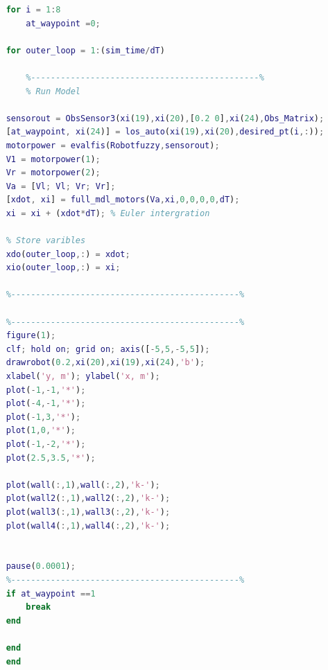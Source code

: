 \documentclass{l4proj}
\begin{document}
\begin{lstlisting}[language=Matlab, float, caption={Task 2 ,With additional waypoints (Test 2)}, label=lst:callahan]
%----------------------------------------------%
    for i = 1:8 
        at_waypoint =0;
    
    for outer_loop = 1:(sim_time/dT)
    
        %----------------------------------------------%
        % Run Model
   
    sensorout = ObsSensor3(xi(19),xi(20),[0.2 0],xi(24),Obs_Matrix);
    [at_waypoint, xi(24)] = los_auto(xi(19),xi(20),desired_pt(i,:));
    motorpower = evalfis(Robotfuzzy,sensorout);
    V1 = motorpower(1);
    Vr = motorpower(2);
    Va = [Vl; Vl; Vr; Vr];
    [xdot, xi] = full_mdl_motors(Va,xi,0,0,0,0,dT);   
    xi = xi + (xdot*dT); % Euler intergration
    
    % Store varibles
    xdo(outer_loop,:) = xdot;
    xio(outer_loop,:) = xi;

    %----------------------------------------------%
    
    %----------------------------------------------%
    figure(1);
    clf; hold on; grid on; axis([-5,5,-5,5]);
    drawrobot(0.2,xi(20),xi(19),xi(24),'b');
    xlabel('y, m'); ylabel('x, m');
    plot(-1,-1,'*');
    plot(-4,-1,'*');
    plot(-1,3,'*');
    plot(1,0,'*');
    plot(-1,-2,'*');
    plot(2.5,3.5,'*');
    
    plot(wall(:,1),wall(:,2),'k-');
    plot(wall2(:,1),wall2(:,2),'k-');
    plot(wall3(:,1),wall3(:,2),'k-');
    plot(wall4(:,1),wall4(:,2),'k-');
  
    
    pause(0.0001);
    %----------------------------------------------%
    if at_waypoint ==1
        break
    end

    end
    end
\end{lstlisting}
\end{document}
